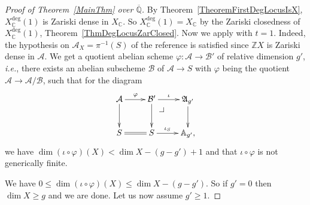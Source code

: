 \documentclass[12pt,oneside]{amsart}
\makeatletter
\numberwithin{maincounter}{section}
\numberwithin{equation}{section}
\def\CC{\mathbb{C}}
\def\ZZ{\mathbb{Z}}
\def\QQ{\mathbb{Q}}
\newcommand{\cal}{\mathcal}
\newcommand{\cA}{\cal{A}}
\newcommand{\cB}{\cal{B}}
\newcommand{\IC}{{\CC}}
\newcommand{\IQbar}{{\overline{\QQ}}}
\newcommand{\IZ}{{\ZZ}}
\newcommand{\pullbackcorner}[1][dr]{\save*!/#1-1.7pc/#1:(-1.5,1.5)@^{|-}\restore}
\newcommand{\philipp}[1]{{\color{blue} Philipp: #1}}
\makeatother
\begin{document}
\begin{proof}[Proof of Theorem~\ref{MainThm} over $\IQbar$]
By Theorem~\ref{TheoremFirstDegLocusIsX}, $X_\IC^{\mathrm{deg}}(1)$ is
Zariski dense in $X_\IC$. So $X_\IC^{\mathrm{deg}}(1) = X_\IC$ by the Zariski
closedness of $X_\IC^{\mathrm{deg}}(1)$,
Theorem~\ref{ThmDegLocusZarClosed}. Now we apply
\cite[Theorem~8.1]{GaoBettiRank} with $t = 1$. %
 Indeed, the hypothesis on 
$\cA_X=\pi^{-1}(S)$ of the reference is satisfied since $\IZ X$ is
Zariski dense in $\cA$. 
We get a quotient abelian
scheme $\varphi \colon \cA \rightarrow \cB'$ of relative dimension
$g'$, \textit{i.e.}, there exists an abelian subscheme $\cB$ of $\cA
\rightarrow S$ with $\varphi$ being the quotient $\cA \rightarrow
\cA/\cB$, such that for the diagram
    \begin{equation*}
      \xymatrix{
        \cA \ar[d]\ar[r]^{\varphi}&      \cB' \ar[d] \ar[r]^-{\iota} \pullbackcorner & \mathfrak{A}_{g'}\ar[d] \\
        S \ar@{=}[r]&      S \ar[r]^-{\iota_S} & \mathbb{A}_{g'},
      }
    \end{equation*}
we have $\dim (\iota\circ\varphi)(X) < \dim X - (g-g') + 1$ and that $\iota\circ \varphi$ is not generically finite.

We have $0 \le \dim (\iota\circ\varphi)(X) \le \dim X - (g-g')$. So if
$g'=0$ then $\dim X \ge g$ and we are done. Let us now assume $g'\ge
1$. 


\end{proof}
\end{document}
